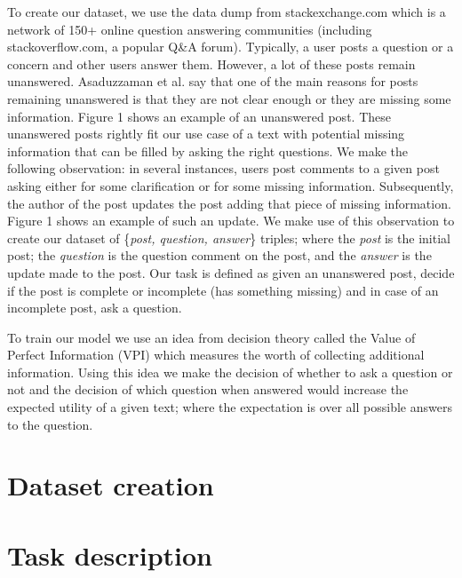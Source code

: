 \documentclass[11pt]{article}
\begin{document}
To create our dataset, we use the data dump from stackexchange.com which is a network of 150+ online question answering communities (including stackoverflow.com, a popular Q\&A forum). Typically, a user posts a question or a concern and other users answer them. However, a lot of these posts remain unanswered. Asaduzzaman et al.  say that one of the main reasons for posts remaining unanswered is that they are not clear enough or they are missing some information. Figure 1 shows an example of an unanswered post. These unanswered posts rightly fit our use case of a text with potential missing information that can be filled by asking the right questions. We make the following observation: in several instances, users post comments to a given post asking either for some clarification or for some missing information. Subsequently, the author of the post updates the post adding that piece of missing information. Figure 1 shows an example of such an update. We make use of this observation to create our dataset of \{\textit{post, question, answer}\} triples; where the \textit{post} is the initial post; the \textit{question} is the question comment on the post, and the \textit{answer} is the update made to the post. Our task is defined as given an unanswered post, decide if the post is complete or incomplete (has something missing) and in case of an incomplete post, ask a question. 
    
To train our model we use an idea from decision theory called the Value of Perfect Information (VPI) which measures the worth of collecting additional information. Using this idea we make the decision of whether to ask a question or not and the decision of which question when answered would increase the expected utility of a given text; where the expectation is over all possible answers to the question. 

\section{Dataset creation}

\section{Task description}
\end{document}

